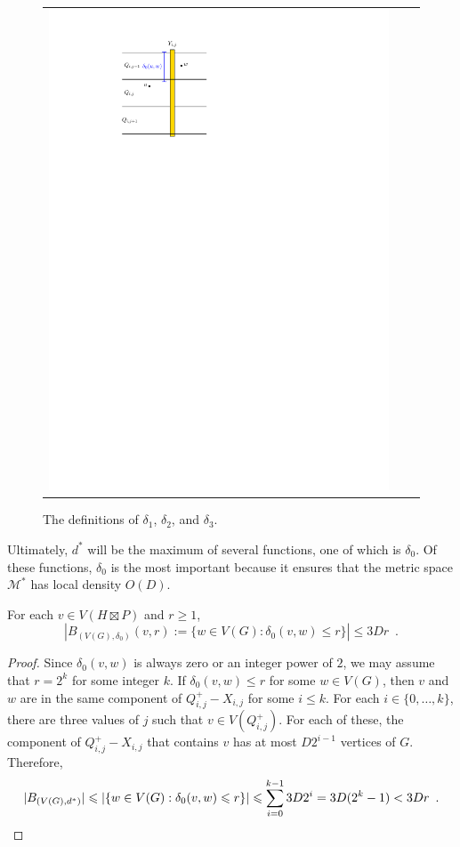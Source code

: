 \documentclass{patmorin}
\renewcommand{\ge}{\geqslant}
\renewcommand{\le}{\leqslant}
\begin{document}
\begin{figure}
\begin{tabular}{ccc}
    \includegraphics[page=3,scale=0.9]{figs/new_metric}
    \end{tabular}
    \caption{The definitions of $\delta_1$, $\delta_2$, and $\delta_3$.}
    \label{d_star}
\end{figure}

Ultimately, $d^*$ will be the maximum of several functions, one of which is $\delta_0$.  Of these functions, $\delta_0$ is the most important because it ensures that the metric space $\mathcal{M}^*$ has local density $O(D)$.

\begin{lem}\label{delta_density}
  For each $v\in V(H\boxtimes P)$ and $r\ge 1$,
  \[
    |B_{(V(G),\delta_0)}(v,r):=\{w\in V(G):\delta_0(v,w)\le r\}| \le 3Dr \enspace .
  \]
\end{lem}

\begin{proof}
  Since $\delta_0(v,w)$ is always zero or an integer power of $2$, we may assume that $r=2^k$ for some integer $k$.  If $\delta_0(v,w)\le r$ for some $w\in V(G)$, then $v$ and $w$ are in the same component of $Q^+_{i,j}-X_{i,j}$ for some $i \le k$.  For each $i\in\{0,\ldots,k\}$, there are three values of $j$ such that $v\in V(Q^+_{i,j})$.  For each of these, the component of $Q^+_{i,j}-X_{i,j}$ that contains $v$ has at most $D2^{i-1}$ vertices of $G$. Therefore,
  \[
    |B_{(V(G),d^*)}| \le |\{w\in V(G): \delta_0(v,w)\le r\}| \le \sum_{i=0}^{k-1} 3D2^{i} = 3D(2^{k}-1) < 3Dr \enspace . \qedhere
  \]
\end{proof}
\end{document}
